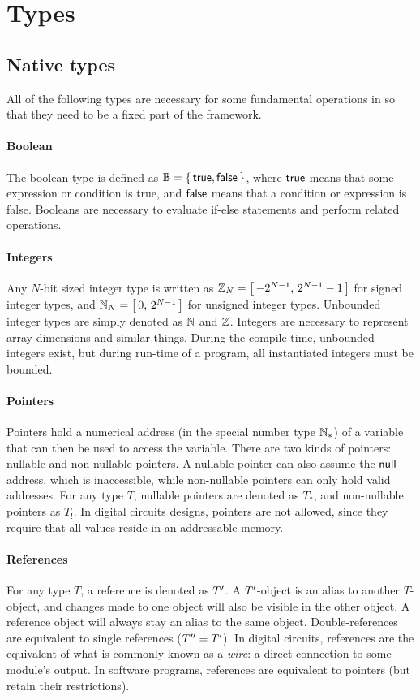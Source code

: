\section{Types}

\subsection{Native types}
All of the following types are necessary for some fundamental operations in {\tetra} so that they need to be a fixed part of the framework.

\paragraph{Boolean}
The boolean type is defined as $\mathbb{B} = \left\{\,\mathsf{true}, \mathsf{false}\,\right\}$, where $\mathsf{true}$ means that some expression or condition is true, and $\mathsf{false}$ means that a condition or expression is false.
Booleans are necessary to evaluate if-else statements and perform related operations.

\paragraph{Integers}
Any $N$-bit sized integer type is written as $\mathbb{Z}_N = \left[\,-2^{N-1},\, 2^{N-1}-1\,\right]$ for signed integer types, and $\mathbb{N}_N = \left[\,0,\,2^{N-1}\,\right]$ for unsigned integer types.
Unbounded integer types are simply denoted as $\mathbb{N}$ and $\mathbb{Z}$.
Integers are necessary to represent array dimensions and similar things.
During the compile time, unbounded integers exist, but during run-time of a program, all instantiated integers must be bounded.

\paragraph{Pointers}
Pointers hold a numerical address (in the special number type $\mathbb{N}_*$) of a variable that can then be used to access the variable.
There are two kinds of pointers: nullable and non-nullable pointers.
A nullable pointer can also assume the $\mathsf{null}$ address, which is inaccessible, while non-nullable pointers can only hold valid addresses.
For any type $T$, nullable pointers are denoted as $T_?$, and non-nullable pointers as $T_!$.
In digital circuits designs, pointers are not allowed, since they require that all values reside in an addressable memory.

\paragraph{References}
For any type $T$, a reference is denoted as $T'$.
A $T'$-object is an alias to another $T$-object, and changes made to one object will also be visible in the other object.
A reference object will always stay an alias to the same object.
Double-references are equivalent to single references ($T''=T'$).
In digital circuits, references are the equivalent of what is commonly known as a \emph{wire}: a direct connection to some module's output.
In software programs, references are equivalent to pointers (but retain their restrictions).

